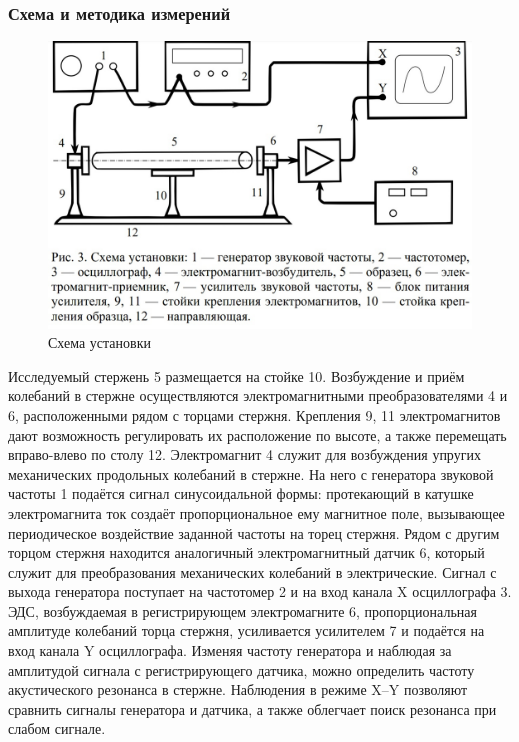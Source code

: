 \documentclass[a4paper,12pt]{article}
\begin{document}
	\subsubsection*{Схема и методика измерений}
	\begin{figure}[h]
		\centering
		\includegraphics[scale=0.31]{3}
		\caption{Схема установки}
		\label{pic3}
	\end{figure}
	
	Исследуемый	стержень 5 размещается на стойке 10. Возбуждение и приём колебаний в стержне осуществляются электромагнитными преобразователями 4 и 6, расположенными рядом с торцами стержня. Крепления 9, 11 электромагнитов дают возможность регулировать их расположение по высоте, а также перемещать вправо-влево по столу 12. Электромагнит 4 служит для возбуждения упругих механических продольных колебаний в стержне. На него с генератора звуковой частоты 1 подаётся сигнал синусоидальной формы: протекающий в катушке электромагнита ток создаёт пропорциональное ему магнитное поле, вызывающее	периодическое воздействие заданной частоты на торец стержня. Рядом с другим торцом стержня находится аналогичный электромагнитный датчик 6, который служит для преобразования механических колебаний в электрические. Сигнал с выхода генератора поступает на частотомер 2 и на вход канала X осциллографа 3. ЭДС, возбуждаемая в регистрирующем электромагните 6, пропорциональная амплитуде колебаний торца стержня, усиливается усилителем 7 и подаётся на вход канала Y осциллографа. Изменяя частоту генератора и наблюдая за амплитудой сигнала с регистрирующего датчика, можно определить частоту акустического резонанса в стержне. Наблюдения в режиме X–Y позволяют сравнить сигналы генератора и датчика, а также облегчает поиск резонанса при слабом сигнале.
	
\end{document}
